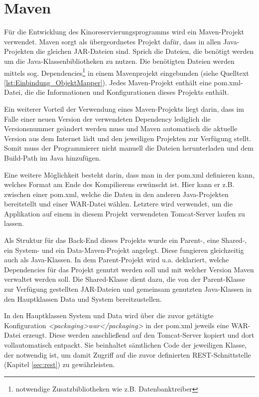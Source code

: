 \section{Maven}
\label{sec:maven}
\authorsection{\authorSG}

Für die Entwicklung des Kinoreservierungsprogramms wird ein Maven-Projekt verwendet.
Maven sorgt als übergeordnetes Projekt dafür, dass in allen Java-Projekten die gleichen JAR-Dateien sind.
Sprich die Dateien, die benötigt werden um die Java-Klassenbibliotheken zu nutzen.
Die benötigten Dateien werden mittels sog. Dependencies\footnote{notwendige Zusatzbibliotheken wie z.B. Datenbanktreiber} in einem Mavenprojekt eingebunden (siehe Quelltext \vref{lst:Einbindung_ObjektMapper}).
Jedes Maven-Projekt enthält eine pom.xml-Datei, die die Informationen und Konfigurationen dieses Projekts enthält.

Ein weiterer Vorteil der Verwendung eines Maven-Projekts liegt darin, dass im Falle einer neuen Version der verwendeten Dependency lediglich die Versionsnummer geändert werden muss und Maven automatisch die aktuelle Version aus dem Internet lädt und den jeweiligen Projekten zur Verfügung stellt.
Somit muss der Programmierer nicht manuell die Dateien herunterladen und dem Build-Path im Java hinzufügen.

Eine weitere Möglichkeit besteht darin, dass man in der pom.xml definieren kann, welches Format am Ende des Kompilierens erwünscht ist.
Hier kann er z.B. zwischen einer pom.xml, welche die Daten in den anderen Java-Projekten bereitstellt und einer WAR-Datei wählen.
Letztere wird verwendet, um die Applikation auf einem in diesem Projekt verwendeten Tomcat-Server laufen zu lassen.

Als Struktur für das Back-End dieses Projekts wurde ein Parent-, eine Shared-, ein System- und ein Data-Maven-Projekt angelegt.
Diese fungieren gleichzeitig auch als Java-Klassen.
In dem Parent-Projekt wird u.a. deklariert, welche Dependencies für das Projekt genutzt werden soll und mit welcher Version Maven verwaltet werden soll.
Die Shared-Klasse dient dazu, die von der Parent-Klasse zur Verfügung gestellten JAR-Dateien und gemeinsam genutzten Java-Klassen in den Hauptklassen Data und System bereitzustellen.

In den Hauptklassen System und Data wird über die zuvor getätigte Konfiguration \emph{<packaging>war</packaging>} in der pom.xml jeweils eine WAR-Datei erzeugt.
Diese werden anschließend auf den Tomcat-Server kopiert und dort vollautomatisch entpackt.
Sie beinhaltet sämtlichen Code der jeweiligen Klasse, der notwendig ist, um damit Zugriff auf die zuvor definierten \acs{REST}-Schnittstelle (Kapitel \vref{sec:rest}) zu gewährleisten.